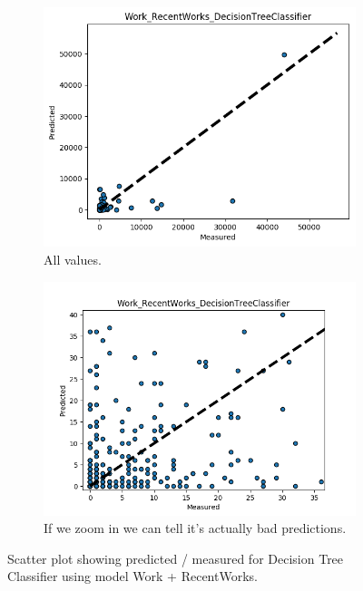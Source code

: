 \begin{figure}
	\centering
	\begin{subfigure}{.5\columnwidth}
		\centering
		\includegraphics[width=\columnwidth]{graphics/Work_RecentWorks_DecisionTreeClassifier.png}
		\caption{All values.}
	\end{subfigure}%
	\begin{subfigure}{.5\columnwidth}
		\centering
		\includegraphics[width=\columnwidth]{graphics/Work_RecentWorks_DecisionTreeClassifierZOOM.png}
		\caption{If we zoom in we can tell it's actually bad predictions.}
	\end{subfigure}
	\caption{Scatter plot showing predicted / measured for Decision Tree Classifier using model Work + RecentWorks.}
	\label{fig:scatterPlot_DTC_WR}
\end{figure}

